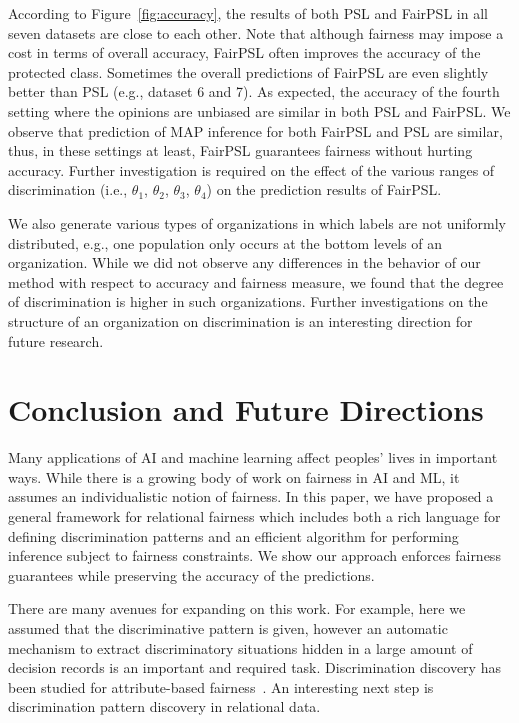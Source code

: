 \documentclass[11pt]{article}
\begin{document}
According to Figure~\ref{fig:accuracy}, the results of both PSL and FairPSL in all seven datasets are close to each other. Note that although fairness may impose a cost in terms of overall accuracy, FairPSL often improves the accuracy of the protected class. Sometimes the overall predictions of FairPSL are even slightly better than PSL (e.g., dataset 6 and 7). As expected, the accuracy of the fourth setting where the opinions are unbiased are similar in both PSL and FairPSL. We observe that prediction of MAP inference for both FairPSL and PSL are similar, thus, in these settings at least, FairPSL guarantees fairness without hurting accuracy. Further investigation is required on the effect of the various ranges of discrimination (i.e., $\theta_1$, $\theta_2$, $\theta_3$, $\theta_4$) on the prediction results of FairPSL.



We also generate various types of organizations in which labels are not uniformly distributed, e.g., one population only occurs at the bottom levels of an organization. While we did not observe any differences in the behavior of our method with respect to accuracy and fairness measure, we found that the degree of discrimination is higher in such organizations. Further investigations on the structure of an organization on discrimination is an interesting direction for future research. 

\section{Conclusion and Future Directions}
\label{sec:conclusion}
Many applications of AI and machine learning affect peoples' lives in important ways. While there is a growing body of work on fairness in AI and ML, it assumes an individualistic notion of fairness.   In this paper, we have proposed a general framework for relational fairness which includes both a rich language for defining discrimination patterns and an efficient algorithm for performing inference subject to fairness constraints. We show our approach enforces fairness guarantees while preserving the accuracy of the predictions. 

There are many avenues for expanding on this work. For example, here we assumed that the discriminative pattern is given, however an automatic mechanism to extract discriminatory situations hidden in a large amount of decision records is an important and required task. Discrimination discovery has been studied for attribute-based fairness~\cite{pedreschi2013discovery}. An interesting next step is discrimination pattern discovery in relational data.
\end{document}
